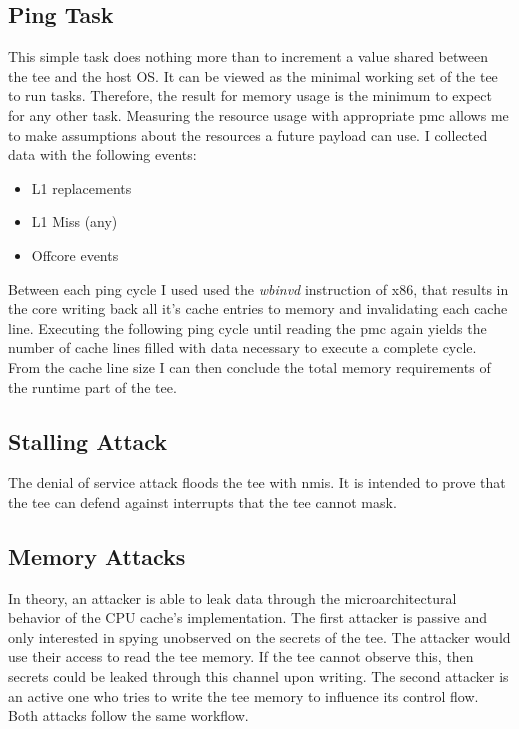 \subsection{Ping Task}
\label{sec:implementation:attacks:ping}
This simple task does nothing more than to increment a value shared between the
\gls{tee} and the host OS. It can be viewed as the minimal working set of the
\gls{tee} to run tasks. Therefore, the result for memory usage is the minimum to
expect for any other task. Measuring the resource usage with appropriate
\gls{pmc} allows me to make assumptions about the resources a future payload can
use. I collected data with the following events:
\begin{itemize}
    \item L1 replacements
    \item L1 Miss (any)
    \item Offcore events 
\end{itemize}
Between each ping cycle I used used the \textit{wbinvd} instruction of x86, that
results in the core writing back all it's cache entries to memory and
invalidating each cache line. Executing the following ping cycle until reading
the \gls{pmc} again yields the number of cache lines filled with data necessary
to execute a complete cycle. From the cache line size I can then conclude the
total memory requirements of the runtime part of the \gls{tee}.

\subsection{Stalling Attack}
The denial of service attack floods the \gls{tee} with \glspl{nmi}. It is
intended to prove that the \gls{tee} can defend against interrupts that the
\gls{tee} cannot mask.

\subsection{Memory Attacks}
\label{sec:implementation:attacks:memory}
In theory, an attacker is able to leak data through the microarchitectural
behavior of the CPU cache's implementation. The first attacker is passive and
only interested in spying unobserved on the secrets of the \gls{tee}. The
attacker would use their access to read the \gls{tee} memory. If the \gls{tee}
cannot observe this, then secrets could be leaked through this channel upon
writing. The second attacker is an active one who tries to write the \gls{tee}
memory to influence its control flow. Both attacks follow the same workflow.\\

